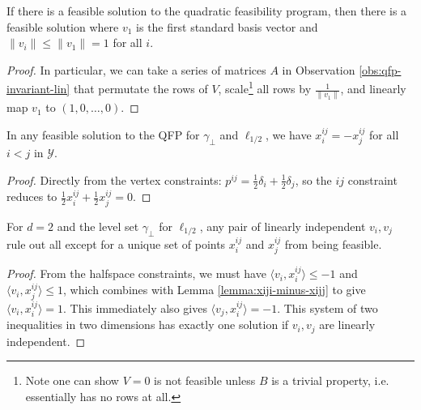 \documentclass[anon]{colt2020} %
\newcommand{\Y}{\mathcal{Y}}
\newcommand{\inprod}[2]{\langle #1, #2 \rangle}%
\begin{document}
\begin{corollary} \label{cor:qfp-wlog-v1}
  If there is a feasible solution to the quadratic feasibility program, then there is a feasible solution where $v_1$ is the first standard basis vector and $\|v_i\| \leq \|v_1\| = 1$ for all $i$.
\end{corollary}
\begin{proof}
  In particular, we can take a series of matrices $A$ in Observation \ref{obs:qfp-invariant-lin} that permutate the rows of $V$, scale\footnote{Note one can show $V = 0$ is not feasible unless $B$ is a trivial property, i.e. essentially has no rows at all.} all rows by $\frac{1}{\|v_1\|}$, and linearly map $v_1$ to $(1,0,\dots,0)$.
\end{proof}

\begin{lemma} \label{lemma:xiji-minus-xijj}
  In any feasible solution to the QFP for $\gamma_{\bot}$ and $\ell_{1/2}$, we have $x^{ij}_i = -x^{ij}_j$ for all $i<j$ in $\Y$.
\end{lemma}
\begin{proof}
  Directly from the vertex constraints: $p^{ij} = \frac{1}{2}\delta_i + \frac{1}{2}\delta_j$, so the $ij$ constraint reduces to $\frac{1}{2}x^{ij}_i + \frac{1}{2}x^{ij}_j = 0$.
\end{proof}

\begin{lemma} \label{lemma:unique-spot-xiji}
  For $d=2$ and the level set $\gamma_\bot$ for $\ell_{1/2}$, any pair of linearly independent $v_i,v_j$ rule out all except for a unique set of points $x^{ij}_i$ and $x^{ij}_j$ from being feasible.
\end{lemma}
\begin{proof}
  From the halfspace constraints, we must have $\inprod{v_i}{x^{ij}_i} \leq -1$ and $\inprod{v_i}{x^{ij}_j} \leq 1$, which combines with Lemma \ref{lemma:xiji-minus-xijj} to give $\inprod{v_i}{x^{ij}_i} = 1$.
  This immediately also gives $\inprod{v_j}{x^{ij}_i} = -1$.
  This system of two inequalities in two dimensions has exactly one solution if $v_i,v_j$ are linearly independent.
\end{proof}
\end{document}

